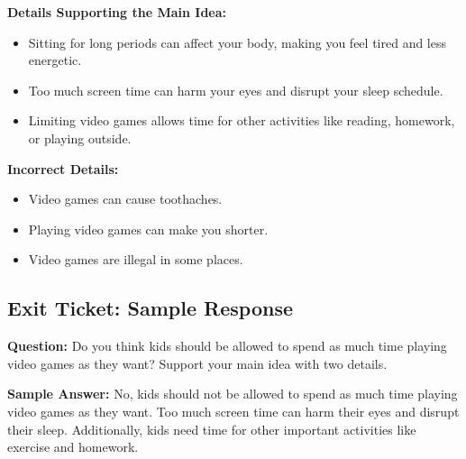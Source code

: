 \documentclass[12pt]{article}
\begin{document}
\textbf{Details Supporting the Main Idea:}
\begin{itemize}
    \item Sitting for long periods can affect your body, making you feel tired and less energetic.
    \item Too much screen time can harm your eyes and disrupt your sleep schedule.
    \item Limiting video games allows time for other activities like reading, homework, or playing outside.
\end{itemize}

\textbf{Incorrect Details:}
\begin{itemize}
    \item Video games can cause toothaches.
    \item Playing video games can make you shorter.
    \item Video games are illegal in some places.
\end{itemize}

\subsection*{Exit Ticket: Sample Response}
\textbf{Question:} Do you think kids should be allowed to spend as much time playing video games as they want? Support your main idea with two details.

\textbf{Sample Answer:} No, kids should not be allowed to spend as much time playing video games as they want. Too much screen time can harm their eyes and disrupt their sleep. Additionally, kids need time for other important activities like exercise and homework.
\end{document}
